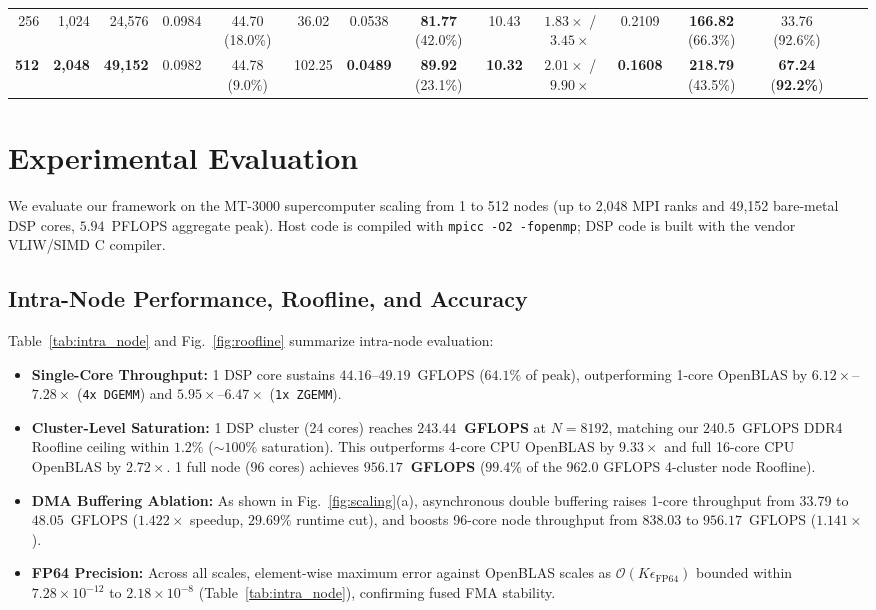 \documentclass[conference]{IEEEtran}
\begin{document}
\begin{table}[t]
{\begin{tabular}{@{}rrrcccccccccccc@{}}
256 & 1,024 & 24,576 & 0.0984 & 44.70 (18.0\%) & 36.02 & 0.0538 & \textbf{81.77} (42.0\%) & 10.43 & $\mathbf{1.83\times}$ / $3.45\times$ & 0.2109 & \textbf{166.82} (66.3\%) & 33.76 (92.6\%) \\
\textbf{512} & \textbf{2,048} & \textbf{49,152} & 0.0982 & 44.78 (9.0\%) & 102.25 & \textbf{0.0489} & \textbf{89.92} (23.1\%) & \textbf{10.32} & $\mathbf{2.01\times}$ / $\mathbf{9.90\times}$ & \textbf{0.1608} & \textbf{218.79} (43.5\%) & \textbf{67.24} (\textbf{92.2\%}) \\
\bottomrule
\end{tabular}%
}
\end{table}

\section{Experimental Evaluation}
\label{sec:eval}
We evaluate our framework on the MT-3000 supercomputer scaling from 1 to 512 nodes (up to 2,048 MPI ranks and 49,152 bare-metal DSP cores, $5.94$~PFLOPS aggregate peak). Host code is compiled with \texttt{mpicc -O2 -fopenmp}; DSP code is built with the vendor VLIW/SIMD C compiler.

\subsection{Intra-Node Performance, Roofline, and Accuracy}
Table~\ref{tab:intra_node} and Fig.~\ref{fig:roofline} summarize intra-node evaluation:
\begin{itemize}\setlength{\itemsep}{0.5pt}\setlength{\parskip}{0pt}
    \item \textbf{Single-Core Throughput:} 1 DSP core sustains $44.16$--$49.19$~GFLOPS ($64.1\%$ of peak), outperforming 1-core OpenBLAS by $6.12\times$--$7.28\times$ (\texttt{4x DGEMM}) and $5.95\times$--$6.47\times$ (\texttt{1x ZGEMM}).
    \item \textbf{Cluster-Level Saturation:} 1 DSP cluster (24 cores) reaches \textbf{$243.44$~GFLOPS} at $N=8192$, matching our $240.5$~GFLOPS DDR4 Roofline ceiling within $1.2\%$ ($\sim\!100\%$ saturation). This outperforms 4-core CPU OpenBLAS by \textbf{$9.33\times$} and full 16-core CPU OpenBLAS by \textbf{$2.72\times$}. 1 full node (96 cores) achieves \textbf{$956.17$~GFLOPS} ($99.4\%$ of the 962.0 GFLOPS 4-cluster node Roofline).
    \item \textbf{DMA Buffering Ablation:} As shown in Fig.~\ref{fig:scaling}(a), asynchronous double buffering raises 1-core throughput from 33.79 to $48.05$~GFLOPS ($1.422\times$ speedup, $29.69\%$ runtime cut), and boosts 96-core node throughput from $838.03$ to $956.17$~GFLOPS ($1.141\times$).
    \item \textbf{FP64 Precision:} Across all scales, element-wise maximum error against OpenBLAS scales as $\mathcal{O}(K \epsilon_{\mathrm{FP64}})$ bounded within $7.28 \times 10^{-12}$ to $2.18 \times 10^{-8}$ (Table~\ref{tab:intra_node}), confirming fused FMA stability.
\end{itemize}
\end{document}
